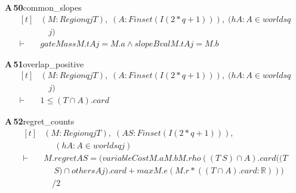 \documentclass[conference]{IEEEtran}
\theoremstyle{definition}
\newcommand{\lean}[1]{\textsf{\footnotesize #1}}
\begin{document}
\noindent\textbf{A\,50}\quad\lean{common\_slopes}
{\footnotesize\[ \begin{aligned}[t]
&(\mathit{M} : \mathit{Region} \mathit{q} \mathit{j} \mathit{T}),\; (\mathit{A} : \mathit{Finset} (\mathit{I} (2*\mathit{q}+1))),\; (\mathit{hA} : \mathit{A} \in \mathit{worlds} \mathit{q}\\
&\quad \mathit{j})\\
\vdash\;&\mathit{gateMass} \mathit{M}.\mathit{t} \mathit{A} \mathit{j}=\mathit{M}.\mathit{a} \wedge \mathit{slopeBval} \mathit{M}.\mathit{t} \mathit{A} \mathit{j}=\mathit{M}.\mathit{b}
\end{aligned} \]}

\noindent\textbf{A\,51}\quad\lean{overlap\_positive}
{\footnotesize\[ \begin{aligned}[t]
&(\mathit{M} : \mathit{Region} \mathit{q} \mathit{j} \mathit{T}),\; (\mathit{A} : \mathit{Finset} (\mathit{I} (2*\mathit{q}+1))),\; (\mathit{hA} : \mathit{A} \in \mathit{worlds} \mathit{q}\\
&\quad \mathit{j})\\
\vdash\;&1 \leq (\mathit{T} \cap \mathit{A}).\mathit{card}
\end{aligned} \]}

\noindent\textbf{A\,52}\quad\lean{regret\_counts}
{\footnotesize\[ \begin{aligned}[t]
&(\mathit{M} : \mathit{Region} \mathit{q} \mathit{j} \mathit{T}),\; (\mathit{A} \mathit{S} : \mathit{Finset} (\mathit{I} (2*\mathit{q}+1))),\\
&\quad \; (\mathit{hA} : \mathit{A} \in \mathit{worlds} \mathit{q} \mathit{j})\\
\vdash\;&\mathit{M}.\mathit{regret} \mathit{A} \mathit{S} = (\mathit{variableCost} \mathit{M}.\mathit{a} \mathit{M}.\mathit{b} \mathit{M}.\mathit{rho} ((\mathit{T} \ \mathit{S}) \cap \mathit{A}).\mathit{card} ((\mathit{T}\\
&\quad \ \mathit{S}) \cap \mathit{others} \mathit{A} \mathit{j}).\mathit{card}+\mathit{max} \mathit{M}.\mathit{e} (\mathit{M}.\mathit{r}*((\mathit{T} \cap \mathit{A}).\mathit{card}:\mathbb{R} )))\\
&\quad /2
\end{aligned} \]}
\end{document}
